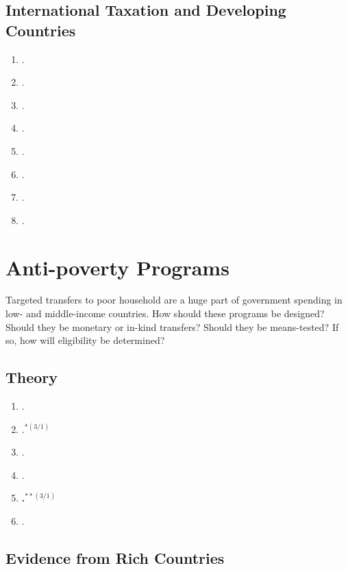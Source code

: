 \documentclass[11pt]{article}
\begin{document}
\subsection{International Taxation and Developing Countries}

\begin{enumerate}
\item {}.
\item {}.
\item {}.
\item {}.
\item {}.
\item {}.
\item {}.
\item {}.
\end{enumerate}

\section{ Anti-poverty Programs}
Targeted transfers to poor household are a huge part of government spending in low- and middle-income countries. How should these programs be designed? Should they be monetary or in-kind transfers? Should they be means-tested? If so, how will eligibility be determined?


\subsection{Theory}

\begin{enumerate}
\item {}.
\item {}.$^{*(3/1)}$
\item {}.
\item {}.
\item \textbf{.$^{**(3/1)}$}
\item {}.
\end{enumerate}

\subsection{Evidence from Rich Countries}
\end{document}
